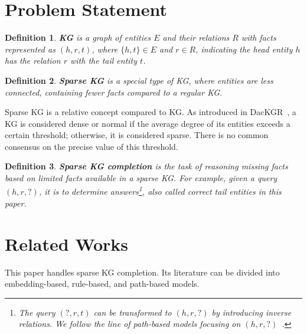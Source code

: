 \documentclass[sigconf]{acmart}
\newtheorem{myDef}{Definition}
\begin{document}
\section{Problem Statement}
\label{sec:problem_statement}

\begin{myDef}
	\textbf{KG} is a graph of entities $E$ and their relations $R$ with facts represented as $(h,r,t)$, where $\{h,t\}\in E$ and $r\in R$, indicating the head entity $h$ has the relation $r$ with the tail entity $t$.
	\label{def:KG}
\end{myDef}

\begin{myDef}
	\textbf{Sparse KG} is a special type of KG, where entities are less connected, containing fewer facts compared to a regular KG. 
	\label{def:SKG}
\end{myDef}
Sparse KG is a relative concept compared to KG. As introduced in DacKGR~\cite{DacKGR}, a KG is considered dense or normal if the average degree of its entities exceeds a certain threshold; otherwise, it is considered sparse. There is no common consensus on the precise value of this threshold.

\begin{myDef}
	\textbf{Sparse KG completion} is the task of reasoning missing facts based on limited facts available in a sparse KG. For example, given a query $(h, r, ?)$, it is to determine answers\footnote{The query $(?, r, t)$ can be transformed to $(h, r, ?)$ by introducing inverse relations. We follow the line of path-based models focusing on $(h, r, ?)$~\cite{DacKGR,SparKGR}.}, also called correct tail entities in this paper.
	\label{def:SKGC}
\end{myDef}

\section{Related Works}
\label{sec:related_works}
This paper handles sparse KG completion. Its literature can be divided into embedding-based, rule-based, and path-based models. 
\end{document}
